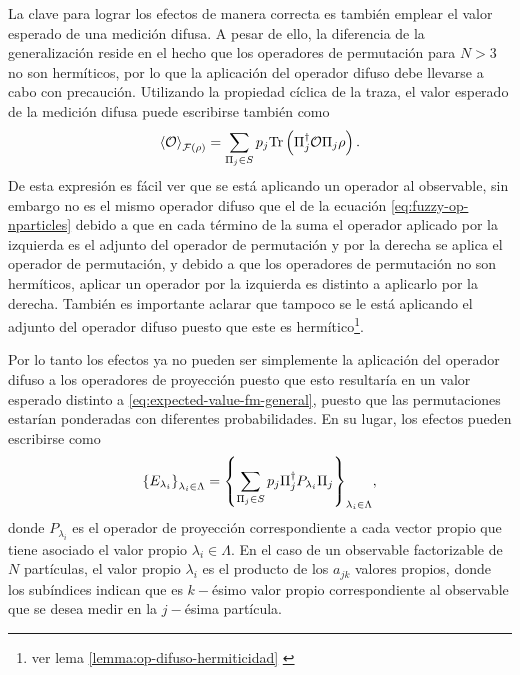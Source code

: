 La clave para lograr los efectos de manera correcta es también emplear el valor
esperado de una medición difusa. A pesar de ello, la diferencia de la
generalización reside en el hecho que los operadores de permutación para $N>3$
no son hermíticos, por lo que la aplicación del operador difuso debe llevarse a
cabo con precaución. Utilizando la propiedad cíclica de la traza, el valor
esperado de la medición difusa puede escribirse también como
\begin{equation}\label{eq:ExpectedValue-generalForm-2}\begin{split}
    \left \langle \mathcal{O}\right \rangle_{\mathcal{F}(\rho)} &=\sum_{\Pi_j \in S}p_j{\rm Tr} \left(\Pi_j^\dagger{\mathcal{O}}\Pi_j\rho\right).\\
\end{split}
\end{equation} 
De esta expresión es fácil ver  que se
está aplicando un operador al observable,
sin embargo no es el mismo operador difuso que el de la ecuación
{\eqref{eq:fuzzy-op-nparticles}} debido a que en cada término de la suma el
operador aplicado por la izquierda es el adjunto del operador de permutación y
por la derecha se aplica el operador de permutación, y debido a que los
operadores de permutación no son hermíticos, aplicar un operador por la
izquierda es distinto a aplicarlo por la derecha. También es importante aclarar
que tampoco se le está aplicando el adjunto del operador difuso puesto que este
es hermítico\footnote[2]{ver lema {\ref{lemma:op-difuso-hermiticidad} }}. 


Por lo tanto los efectos ya no pueden ser simplemente la aplicación del
operador difuso a los operadores de proyección puesto que esto resultaría en un
valor esperado distinto a {\eqref{eq:expected-value-fm-general}}, puesto que
las permutaciones estarían ponderadas con diferentes probabilidades. En su
lugar, los efectos pueden escribirse como
\begin{equation}\label{eq:effectsSetNp}
    {\{E_{\lambda_i}\}}_{\lambda_i \in \Lambda}={\left\{\sum_{\Pi_j \in S} p_j \Pi_{j}^{\dagger}P_{\lambda_i}\Pi_{j}\right\}}_{\lambda_i \in \Lambda},
\end{equation}  
donde $P_{\lambda_i}$ es el operador de proyección correspondiente a cada
vector propio que tiene asociado el valor propio $\lambda_i\in \Lambda$.  En el
caso de un observable factorizable de $N$ partículas,  el valor propio
$\lambda_i$ es el producto de los $a_{jk}$ valores propios, donde los
subíndices indican que es $k-$ésimo valor propio correspondiente al observable
que se desea medir en la $j-$ésima partícula. 

